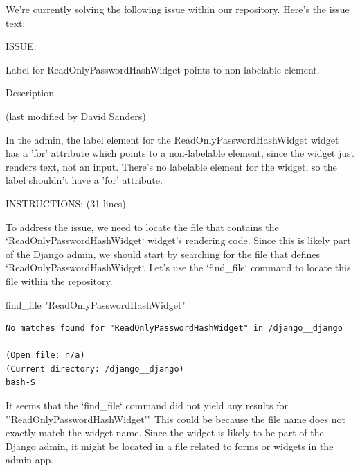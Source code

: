 {
\captionsetup{type=figure}
\begin{issuebox}
We're currently solving the following issue within our repository. Here's the issue text:

ISSUE:

Label for ReadOnlyPasswordHashWidget points to non-labelable element.

Description

		(last modified by David Sanders)

In the admin, the label element for the ReadOnlyPasswordHashWidget widget has a 'for' attribute which points to a non-labelable element, since the widget just renders text, not an input. There's no labelable element for the widget, so the label shouldn't have a 'for' attribute.


INSTRUCTIONS: (31 lines)

\end{issuebox}
\begin{agentbox}
To address the issue, we need to locate the file that contains the `ReadOnlyPasswordHashWidget` widget's rendering code. Since this is likely part of the Django admin, we should start by searching for the file that defines `ReadOnlyPasswordHashWidget`. Let's use the `find\_file` command to locate this file within the repository.

\hrulefill
\begin{CodeVerbatim}[breaklines=true, breakanywhere=true]
find_file "ReadOnlyPasswordHashWidget"
\end{CodeVerbatim}
\end{agentbox}
\begin{observationbox}\begin{Verbatim}[breaklines=true, breakanywhere=true]
No matches found for "ReadOnlyPasswordHashWidget" in /django__django

(Open file: n/a)
(Current directory: /django__django)
bash-$
\end{Verbatim}
\end{observationbox}
\begin{agentbox}
It seems that the `find\_file` command did not yield any results for ''ReadOnlyPasswordHashWidget''. This could be because the file name does not exactly match the widget name. Since the widget is likely to be part of the Django admin, it might be located in a file related to forms or widgets in the admin app.



\end{agentbox}}
